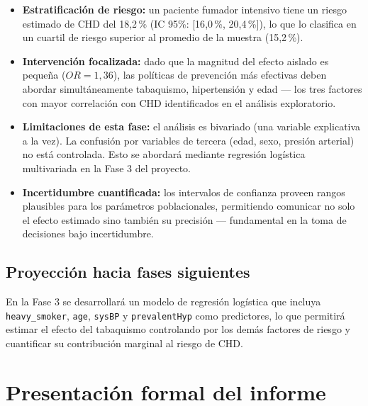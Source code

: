 \documentclass[11pt,a4paper]{article}
\begin{document}
\begin{itemize}
  \item \textbf{Estratificación de riesgo:} un paciente fumador intensivo tiene un riesgo
        estimado de CHD del 18{,}2\,\% (IC 95\%: [16{,}0\,\%, 20{,}4\,\%]), lo que lo
        clasifica en un cuartil de riesgo superior al promedio de la muestra (15{,}2\,\%).

  \item \textbf{Intervención focalizada:} dado que la magnitud del efecto aislado es
        pequeña ($OR = 1{,}36$), las políticas de prevención más efectivas deben abordar
        simultáneamente tabaquismo, hipertensión y edad — los tres factores con mayor
        correlación con CHD identificados en el análisis exploratorio.

  \item \textbf{Limitaciones de esta fase:} el análisis es bivariado (una variable
        explicativa a la vez). La confusión por variables de tercera (edad, sexo,
        presión arterial) no está controlada. Esto se abordará mediante regresión
        logística multivariada en la Fase 3 del proyecto.

  \item \textbf{Incertidumbre cuantificada:} los intervalos de confianza proveen rangos
        plausibles para los parámetros poblacionales, permitiendo comunicar no solo el
        efecto estimado sino también su precisión — fundamental en la toma de decisiones
        bajo incertidumbre.
\end{itemize}

\subsection{Proyección hacia fases siguientes}

En la Fase 3 se desarrollará un modelo de regresión logística que incluya
\texttt{heavy\_smoker}, \texttt{age}, \texttt{sysBP} y \texttt{prevalentHyp} como
predictores, lo que permitirá estimar el efecto del tabaquismo controlando por los
demás factores de riesgo y cuantificar su contribución marginal al riesgo de CHD.

\section{Presentación formal del informe}
\label{sec:formato}
\end{document}
